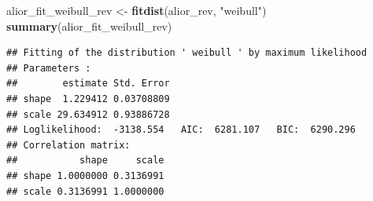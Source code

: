 \documentclass[
]{article}
\newenvironment{Shaded}{\begin{snugshade}}{\end{snugshade}}
\newcommand{\AttributeTok}[1]{\textcolor[rgb]{0.13,0.29,0.53}{#1}}
\newcommand{\ControlFlowTok}[1]{\textcolor[rgb]{0.13,0.29,0.53}{\textbf{#1}}}
\newcommand{\FloatTok}[1]{\textcolor[rgb]{0.00,0.00,0.81}{#1}}
\newcommand{\FunctionTok}[1]{\textcolor[rgb]{0.13,0.29,0.53}{\textbf{#1}}}
\newcommand{\NormalTok}[1]{#1}
\newcommand{\OtherTok}[1]{\textcolor[rgb]{0.56,0.35,0.01}{#1}}
\newcommand{\SpecialCharTok}[1]{\textcolor[rgb]{0.81,0.36,0.00}{\textbf{#1}}}
\newcommand{\StringTok}[1]{\textcolor[rgb]{0.31,0.60,0.02}{#1}}
\begin{document}
\begin{Shaded}
\begin{Highlighting}[]
\NormalTok{alior\_fit\_weibull\_rev }\OtherTok{\textless{}{-}} \FunctionTok{fitdist}\NormalTok{(alior\_rev, }\StringTok{"weibull"}\NormalTok{)}
\FunctionTok{summary}\NormalTok{(alior\_fit\_weibull\_rev)}
\end{Highlighting}
\end{Shaded}

\begin{verbatim}
## Fitting of the distribution ' weibull ' by maximum likelihood 
## Parameters : 
##        estimate Std. Error
## shape  1.229412 0.03708809
## scale 29.634912 0.93886728
## Loglikelihood:  -3138.554   AIC:  6281.107   BIC:  6290.296 
## Correlation matrix:
##           shape     scale
## shape 1.0000000 0.3136991
## scale 0.3136991 1.0000000
\end{verbatim}

\begin{Shaded}
\end{Shaded}
\end{document}
